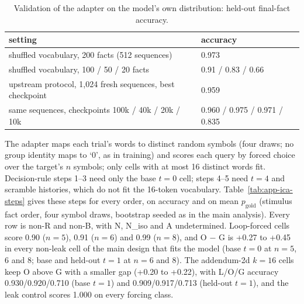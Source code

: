 \documentclass[11pt]{article}
\begin{document}
\begin{table}[tbp]
\centering
\small
\caption{Validation of the adapter on the model's own distribution: held-out final-fact accuracy.}\label{tab:app-ica-valid}
\begin{tabular}{@{}ll@{}}
\toprule
setting & accuracy \\
\midrule
shuffled vocabulary, 200 facts (512 sequences) & 0.973 \\
shuffled vocabulary, 100 / 50 / 20 facts & 0.91 / 0.83 / 0.66 \\
upstream protocol, 1,024 fresh sequences, best checkpoint & 0.959 \\
same sequences, checkpoints 100k / 40k / 20k / 10k & 0.960 / 0.975 / 0.971 / 0.835 \\
\bottomrule
\end{tabular}
\end{table}

The adapter maps each trial's words to distinct random symbols (four draws; no group identity maps to `0', as in training) and scores each query by forced choice over the target's $n$ symbols; only cells with at most 16 distinct words fit. Decision-rule steps 1--3 need only the base $t = 0$ cell; steps 4--5 need $t = 4$ and scramble histories, which do not fit the 16-token vocabulary. Table~\ref{tab:app-ica-steps} gives these steps for every order, on accuracy and on mean $p_{\mathrm{gold}}$ (stimulus fact order, four symbol draws, bootstrap seeded as in the main analysis). Every row is non-R and non-B, with N, N\_iso and A undetermined. Loop-forced cells score 0.90 ($n = 5$), 0.91 ($n = 6$) and 0.99 ($n = 8$), and O $-$ G is +0.27 to +0.45 in every non-leak cell of the main design that fits the model (base $t = 0$ at $n = 5$, 6 and 8; base and held-out $t = 1$ at $n = 6$ and 8). The addendum-2d $k = 16$ cells keep O above G with a smaller gap (+0.20 to +0.22), with L/O/G accuracy 0.930/0.920/0.710 (base $t = 1$) and 0.909/0.917/0.713 (held-out $t = 1$), and the leak control scores 1.000 on every forcing class.
\end{document}
